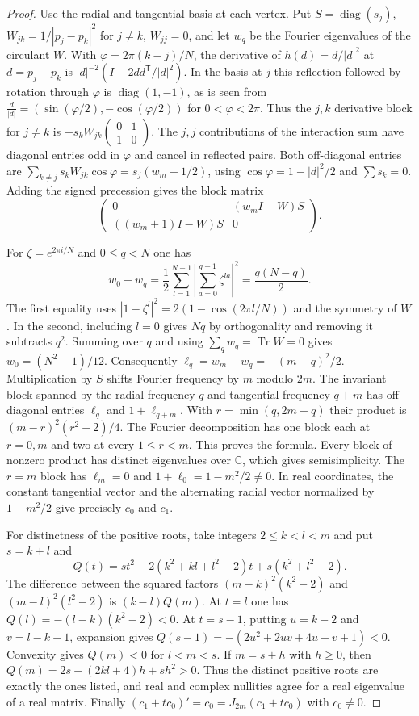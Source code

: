 \documentclass[aps,pra,onecolumn,superscriptaddress,nofootinbib,10pt]{revtex4-2}
\theoremstyle{definition}
\theoremstyle{remark}
\begin{document}
\begin{proof}
Use the radial and tangential basis at each vertex. Put
$S=\operatorname{diag}(s_j)$, $W_{jk}=1/|p_j-p_k|^2$ for $j\ne k$,
$W_{jj}=0$, and let $w_q$ be the Fourier eigenvalues of the circulant $W$.
With $\varphi=2\pi(k-j)/N$, the derivative of
$h(d)=d/|d|^2$ at $d=p_j-p_k$ is
$|d|^{-2}(I-2dd^{\mathsf T}/|d|^2)$. In the basis at $j$ this
reflection followed by rotation through $\varphi$ is
$\operatorname{diag}(1,-1)$, as is seen from
$\frac{d}{|d|}=(\sin(\varphi/2),-\cos(\varphi/2))$ for $0<\varphi<2\pi$.
Thus the $j,k$ derivative block for $j\ne k$ is
$-s_k W_{jk}\left(\begin{smallmatrix}0&1\\1&0\end{smallmatrix}\right)$.
The $j,j$ contributions of the interaction sum have diagonal entries
odd in $\varphi$ and cancel in reflected pairs. Both off-diagonal entries
are $\sum_{k\ne j}s_k W_{jk}\cos\varphi=s_j(w_m+1/2)$,
using $\cos\varphi=1-|d|^2/2$ and $\sum s_k=0$.
Adding the signed precession gives the block matrix
\[
 \begin{pmatrix}
  0&(w_m I-W)S\\ ((w_m+1)I-W)S&0
 \end{pmatrix}.
\]

For $\zeta=e^{2\pi i/N}$ and $0\le q<N$ one has
\[
 w_0-w_q
 =\frac12\sum_{l=1}^{N-1}\left|\sum_{a=0}^{q-1}\zeta^{la}\right|^2
 =\frac{q(N-q)}2 .
\]
The first equality uses $|1-\zeta^l|^2=2(1-\cos(2\pi l/N))$
and the symmetry of $W$. In the second, including $l=0$ gives $Nq$
by orthogonality and removing it subtracts $q^2$.
Summing over $q$ and using $\sum_q w_q=\operatorname{Tr}W=0$ gives
$w_0=(N^2-1)/12$. Consequently
$\ell_q=w_m-w_q=-(m-q)^2/2$. Multiplication by $S$ shifts Fourier
frequency by $m$ modulo $2m$. The invariant block spanned by the radial
frequency $q$ and tangential frequency $q+m$ has off-diagonal
entries $\ell_q$ and $1+\ell_{q+m}$. With $r=\min(q,2m-q)$ their
product is $(m-r)^2(r^2-2)/4$. The Fourier decomposition has one block
each at $r=0,m$ and two at every $1\le r<m$. This proves the formula.
Every block of nonzero product has distinct eigenvalues over
$\mathbb C$, which gives semisimplicity. The $r=m$ block has
$\ell_m=0$ and $1+\ell_0=1-m^2/2\ne0$. In real coordinates, the
constant tangential vector and the alternating radial vector normalized
by $1-m^2/2$ give precisely $c_0$ and $c_1$.

For distinctness of the positive roots, take integers $2\le k<l<m$
and put $s=k+l$ and
\[
 Q(t)=s t^2-2(k^2+kl+l^2-2)t+s(k^2+l^2-2).
\]
The difference between the squared factors $(m-k)^2(k^2-2)$ and
$(m-l)^2(l^2-2)$ is $(k-l)Q(m)$. At $t=l$ one has
$Q(l)=-(l-k)(k^2-2)<0$. At $t=s-1$, putting $u=k-2$ and
$v=l-k-1$, expansion gives $Q(s-1)=-(2u^2+2uv+4u+v+1)<0$.
Convexity gives $Q(m)<0$ for $l<m<s$. If $m=s+h$ with $h\ge0$,
then $Q(m)=2s+(2kl+4)h+sh^2>0$. Thus the distinct positive roots
are exactly the ones listed, and real and complex nullities agree
for a real eigenvalue of a real matrix. Finally
$(c_1+t c_0)'=c_0=J_{2m}(c_1+t c_0)$ with $c_0\ne0$.
\end{proof}
\end{document}
